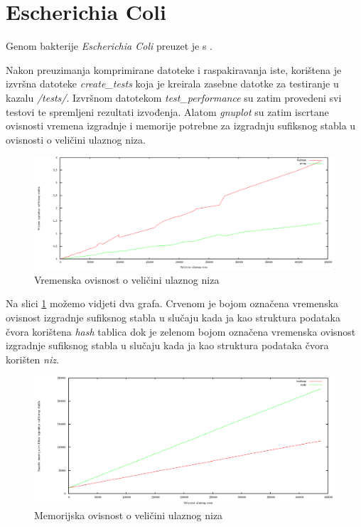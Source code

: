 \documentclass[times, utf8, seminar, numeric]{fer}
\begin{document}
\section{Escherichia Coli}
	Genom bakterije \textit{Escherichia Coli} preuzet je s \cite{ecoli}. 
	
	Nakon preuzimanja komprimirane datoteke i raspakiravanja iste, korištena je izvršna datoteke \textit{create\_tests} koja je kreirala zasebne datotke za testiranje u kazalu \textit{/tests/}. Izvršnom datotekom \textit{test\_performance} su zatim provedeni svi testovi te spremljeni rezultati izvođenja. Alatom \textit{gnuplot} su zatim iscrtane ovisnosti vremena izgradnje i memorije potrebne za izgradnju sufiksnog stabla u ovisnosti o veličini ulaznog niza.

\begin{figure}[h!]	
	\centering
	\includegraphics[width=1\textwidth]{media/time_1.png}
	\caption{Vremenska ovisnost o veličini ulaznog niza}
	\label{image:time}
\end{figure}

Na slici \ref{image:time} možemo vidjeti dva grafa. Crvenom je bojom označena vremenska ovisnost izgradnje sufiksnog stabla u slučaju kada ja kao struktura podataka čvora korištena \textit{hash} tablica dok je zelenom bojom označena vremenska ovisnost izgradnje sufiksnog stabla u slučaju kada ja kao struktura podataka čvora korišten \textit{niz}.

\pagebreak %
\begin{figure}[h!]	
	\centering
	\includegraphics[width=1\textwidth]{media/memory_1.png}
	\caption{Memorijska ovisnost o veličini ulaznog niza}
	\label{image:memory}
\end{figure}
\end{document}
